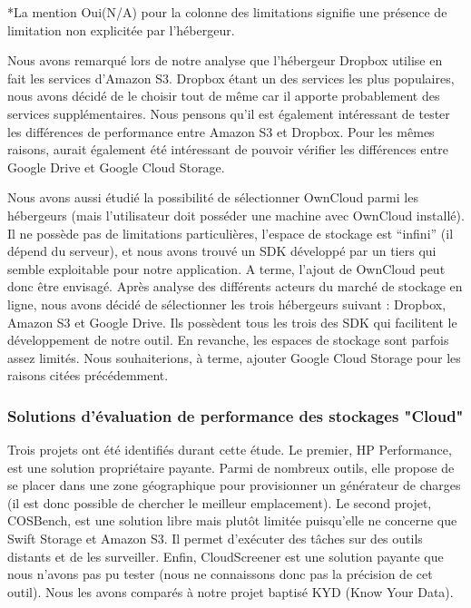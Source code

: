 \documentclass[10pt]{article}
\begin{document}
*La mention Oui(N/A) pour la colonne des limitations signifie une présence de limitation non explicitée par l'hébergeur.

Nous avons remarqué lors de notre analyse que l’hébergeur Dropbox utilise en fait les services d'Amazon S3. Dropbox étant un des services les plus populaires, nous avons décidé de le choisir tout de même car il apporte probablement des services supplémentaires. Nous pensons qu’il est également intéressant de tester les différences de performance entre Amazon S3 et Dropbox. Pour les mêmes raisons, aurait également été intéressant de pouvoir vérifier les différences entre Google Drive et Google Cloud Storage.

Nous avons aussi étudié la possibilité de sélectionner OwnCloud parmi les hébergeurs (mais l’utilisateur doit posséder une machine avec OwnCloud installé). Il ne possède pas de limitations particulières, l’espace de stockage est “infini” (il dépend du serveur), et nous avons trouvé un SDK développé par un tiers qui semble exploitable pour notre application. A terme, l’ajout de OwnCloud peut donc être envisagé. Après analyse des différents acteurs du marché de stockage en ligne, nous avons décidé de sélectionner les trois hébergeurs suivant : Dropbox, Amazon S3 et Google Drive. Ils possèdent tous les trois des SDK qui facilitent le développement de notre outil. En revanche, les espaces de stockage sont parfois assez limités. Nous souhaiterions, à terme, ajouter Google Cloud Storage pour les raisons citées précédemment.

\subsubsection{Solutions d'évaluation de performance des stockages "Cloud"}

Trois projets ont été identifiés durant cette étude. Le premier, HP Performance, est une solution propriétaire payante. Parmi de nombreux outils, elle propose de se placer dans une zone géographique pour provisionner un générateur de charges (il est donc possible de chercher le meilleur emplacement). Le second projet, COSBench, est une solution libre mais plutôt limitée puisqu’elle ne concerne que Swift Storage et Amazon S3. Il permet d'exécuter des tâches sur des outils distants et de les surveiller. Enfin, CloudScreener est une solution payante que nous n’avons pas pu tester (nous ne connaissons donc pas la précision de cet outil). Nous les avons comparés à notre projet baptisé KYD (Know Your Data).
\newpage
\end{document}
